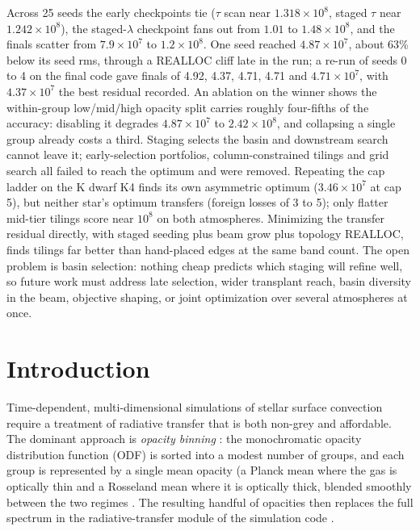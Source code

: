 \documentclass{aa}
\begin{document}
   {Across 25 seeds the early checkpoints tie ($\tau$ scan near
    $1.318\times10^{8}$, staged $\tau$ near $1.242\times10^{8}$), the
    staged-$\lambda$ checkpoint fans out from $1.01$ to
    $1.48\times10^{8}$, and the finals scatter from $7.9\times10^{7}$ to
    $1.2\times10^{8}$. One seed reached $4.87\times10^{7}$, about 63\%
    below its seed rms, through a REALLOC cliff late in the run; a
    re-run of seeds 0 to 4 on the final code gave finals of 4.92, 4.37,
    4.71, 4.71 and $4.71\times10^{7}$, with $4.37\times10^{7}$ the best
    residual recorded. An ablation on the winner shows the within-group
    low/mid/high opacity split carries roughly four-fifths of the
    accuracy: disabling it degrades $4.87\times10^{7}$ to
    $2.42\times10^{8}$, and collapsing a single group already costs a
   third. Staging selects the basin and downstream search
   cannot leave it; early-selection portfolios, column-constrained
   tilings and grid search all failed to reach the optimum and were
   removed. Repeating the cap ladder on the K dwarf K4 finds its own
   asymmetric optimum ($3.46\times10^{7}$ at cap 5), but neither star's
   optimum transfers (foreign losses of 3 to 5); only flatter mid-tier
   tilings score near $10^{8}$ on both atmospheres.}
   {Minimizing the transfer residual directly, with staged seeding plus
   beam grow plus topology REALLOC, finds tilings far better than
   hand-placed edges at the same band count. The open problem is basin
   selection: nothing cheap predicts which staging will refine well, so
   future work must address late selection, wider transplant reach,
   basin diversity in the beam, objective shaping, or joint optimization
   over several atmospheres at once.}


   \maketitle

\section{Introduction}
\label{sec:intro}

   Time-dependent, multi-dimensional simulations of stellar surface
   convection require a treatment of radiative transfer that is both
   non-grey and affordable. The dominant approach is \emph{opacity
   binning} \citep{nordlund1982,ludwig1992,ludwig1994,skartlien2000,vogler2004}: the
   monochromatic opacity distribution function (ODF) is sorted into a
   modest number of groups, and each group is represented by a single
   mean opacity (a Planck mean where the gas is optically thin and a
   Rosseland mean where it is optically thick, blended smoothly between
   the two regimes \citep[Eq.~12]{vogler2004}. The resulting handful of
   opacities then replaces the full spectrum in the radiative-transfer
   module of the simulation code \citep[e.g.][]{vogler2005,magic2013}.
\end{document}
